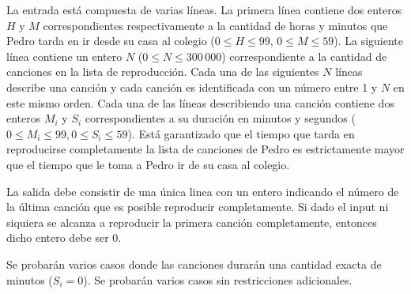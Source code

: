 \documentclass{oci}
\begin{document}
\begin{inputDescription}
  La entrada está compuesta de varias líneas.
  La primera línea contiene dos enteros $H$ y $M$ correspondientes
  respectivamente a la cantidad de horas y minutos que Pedro tarda en ir desde su
  casa al colegio ($0\leq H\leq 99$, $0\leq M\leq 59$).
  La siguiente línea contiene un entero $N$ ($0\leq N\leq 300\,000$)
  correspondiente a la cantidad de canciones en la lista de reproducción.
  Cada una de las siguientes $N$ líneas describe una canción y cada canción es
  identificada con un número entre 1 y $N$ en este mismo orden.
  Cada una de las líneas describiendo una canción contiene dos enteros $M_i$ y $S_i$
  correspondientes a su duración en minutos y segundos ($0\leq
  M_i\leq 99, 0\leq S_i\leq 59$).
  Está garantizado que el tiempo que tarda en reproducirse completamente la lista de canciones 
  de Pedro es estrictamente mayor que el tiempo que le toma a Pedro ir de su casa al colegio.
\end{inputDescription}

\begin{outputDescription}
  La salida debe consistir de una única linea con un entero indicando el número 
  de la última canción que es posible reproducir completamente.
  Si dado el input ni siquiera se alcanza a reproducir la primera canción completamente,
  entonces dicho entero debe ser 0.
\end{outputDescription}

\begin{scoreDescription}
   Se probarán varios casos donde las canciones durarán una cantidad
  exacta de minutos ($S_i = 0$).
   Se probarán varios casos sin restricciones adicionales. 
\end{scoreDescription}

\begin{sampleDescription}
\end{sampleDescription}
\end{document}

